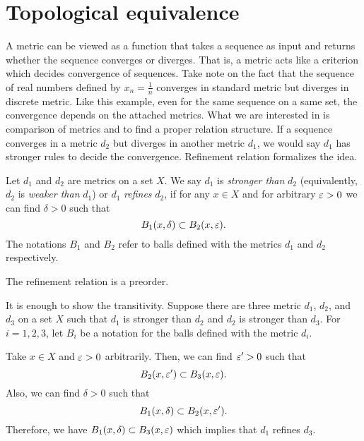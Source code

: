 \documentclass{../note}
\begin{document}
\section{Topological equivalence}
A metric can be viewed as a function that takes a sequence as input and returns whether the sequence converges or diverges.
That is, a metric acts like a criterion which decides convergence of sequences.
Take note on the fact that the sequence of real numbers defined by $x_n=\frac1n$ converges in standard metric but diverges in discrete metric.
Like this example, even for the same sequence on a same set, the convergence depends on the attached metrics.
What we are interested in is comparison of metrics and to find a proper relation structure.
If a sequence converges in a metric $d_2$ but diverges in another metric $d_1$, we would say $d_1$ has stronger rules to decide the convergence.
Refinement relation formalizes the idea.

\begin{defn}
Let $d_1$ and $d_2$ are metrics on a set $X$.
We say $d_1$ is \emph{stronger than} $d_2$ (equivalently, $d_2$ is \emph{weaker than} $d_1$) or $d_1$ \emph{refines} $d_2$, if for any $x\in X$ and for arbitrary $\varepsilon>0$ we can find $\delta>0$ such that
\[B_1(x,\delta)\subset B_2(x,\varepsilon).\]
The notations $B_1$ and $B_2$ refer to balls defined with the metrics $d_1$ and $d_2$ respectively.
\end{defn}

\begin{prop}
The refinement relation is a preorder.
\end{prop}
\begin{pf}
It is enough to show the transitivity.
Suppose there are three metric $d_1$, $d_2$, and $d_3$ on a set $X$ such that $d_1$ is stronger than $d_2$ and $d_2$ is stronger than $d_3$.
For $i=1,2,3$, let $B_i$ be a notation for the balls defined with the metric $d_i$.

Take $x\in X$ and $\varepsilon>0$ arbitrarily.
Then, we can find $\varepsilon'>0$ such that
\[B_2(x,\varepsilon')\subset B_3(x,\varepsilon).\]
Also, we can find $\delta>0$ such that
\[B_1(x,\delta)\subset B_2(x,\varepsilon').\]
Therefore, we have $B_1(x,\delta)\subset B_3(x,\varepsilon)$ which implies that $d_1$ refines $d_3$.
\end{pf}
\end{document}
